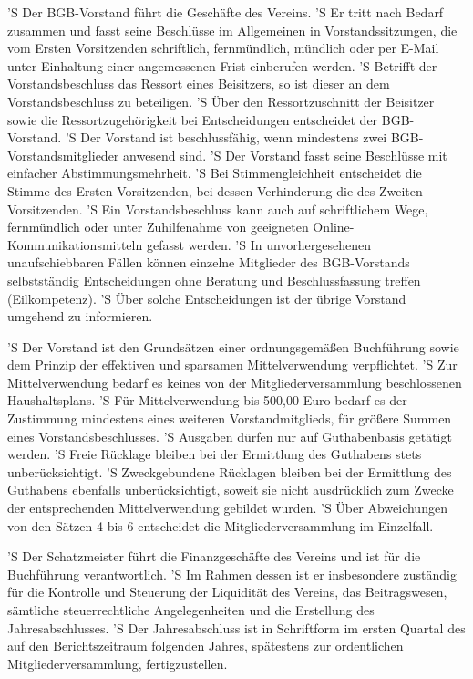 \documentclass[a4paper,10pt]{scrreprt}
\begin{document}
\begin{contract}
'S Der BGB-Vorstand führt die Geschäfte des Vereins.
'S Er tritt nach Bedarf zusammen und fasst seine Beschlüsse im Allgemeinen in
Vorstandssitzungen, die vom Ersten Vorsitzenden schriftlich, fernmündlich,
mündlich oder per E-Mail unter Einhaltung einer angemessenen Frist einberufen
werden.
'S Betrifft der Vorstandsbeschluss das Ressort eines Beisitzers, so ist dieser
an dem Vorstandsbeschluss zu beteiligen.
'S Über den Ressortzuschnitt der Beisitzer sowie die Ressortzugehörigkeit
bei Entscheidungen entscheidet der BGB-Vorstand.
'S Der Vorstand ist beschlussfähig, wenn mindestens zwei BGB-Vorstandsmitglieder
anwesend sind.
'S Der Vorstand fasst seine Beschlüsse mit einfacher Abstimmungsmehrheit.
'S Bei Stimmengleichheit entscheidet die Stimme des Ersten Vorsitzenden, bei
dessen Verhinderung die des Zweiten Vorsitzenden.
'S Ein Vorstandsbeschluss kann auch auf schriftlichem Wege, fernmündlich oder
unter Zuhilfenahme von geeigneten Online-Kommunikationsmitteln gefasst werden.
'S In unvorhergesehenen unaufschiebbaren Fällen können einzelne Mitglieder des
BGB-Vorstands selbstständig Entscheidungen ohne Beratung und Beschlussfassung
treffen (Eilkompetenz).
'S Über solche Entscheidungen ist der übrige Vorstand umgehend zu informieren.

'S Der Vorstand ist den Grundsätzen einer ordnungsgemäßen Buchführung sowie dem
Prinzip der effektiven und sparsamen Mittelverwendung verpflichtet.
'S Zur Mittelverwendung bedarf es keines von der Mitgliederversammlung
beschlossenen Haushaltsplans.
'S Für Mittelverwendung bis 500,00 Euro bedarf es der Zustimmung mindestens
eines weiteren Vorstandmitglieds, für größere Summen eines Vorstandsbeschlusses.
'S Ausgaben dürfen nur auf Guthabenbasis getätigt werden.
'S Freie Rücklage bleiben bei der Ermittlung des Guthabens stets
unberücksichtigt.
'S Zweckgebundene Rücklagen bleiben bei der Ermittlung des Guthabens ebenfalls
unberücksichtigt, soweit sie nicht ausdrücklich zum Zwecke der entsprechenden
Mittelverwendung gebildet wurden.
'S Über Abweichungen von den Sätzen 4 bis 6 entscheidet die
Mitgliederversammlung im Einzelfall.

'S Der Schatzmeister führt die Finanzgeschäfte des Vereins und ist für die
Buchführung verantwortlich.
'S Im Rahmen dessen ist er insbesondere zuständig für die Kontrolle und
Steuerung der Liquidität des Vereins, das Beitragswesen, sämtliche
steuerrechtliche Angelegenheiten und die Erstellung des Jahresabschlusses.
'S Der Jahresabschluss ist in Schriftform im ersten Quartal des auf den
Berichtszeitraum folgenden Jahres, spätestens zur ordentlichen
Mitgliederversammlung, fertigzustellen.


\end{contract}
\end{document}
